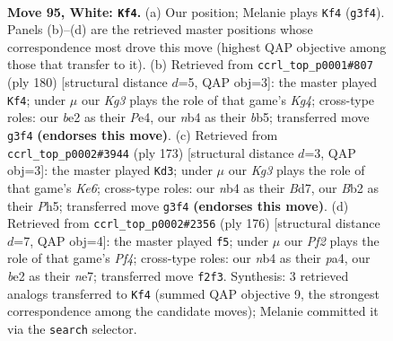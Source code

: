 \documentclass[11pt]{article}
\begin{document}
\clearpage

\begin{figure}[p]\centering
\begin{subfigure}{0.46\textwidth}\centering
\resizebox{\linewidth}{!}{%
\newchessgame
\chessboard[
  setfen={8/7k/8/8/1n6/6K1/1B2bP2/8 w - - 35 95},
  showmover=false,
  pgfstyle=straightmove, color=movearrow, markmove={g3-f4}
]}
\caption{}
\end{subfigure}\hfill
\begin{subfigure}{0.46\textwidth}\centering
\resizebox{\linewidth}{!}{%
\newchessgame
\chessboard[
  setfen={8/5k2/8/1b6/3BP1K1/5P2/8/8 w - - 5 91},
  showmover=false,
  pgfstyle=straightmove, color=movearrow, markmove={g4-f4}
]}
\caption{}
\end{subfigure}
\\[4pt]
\begin{subfigure}{0.46\textwidth}\centering
\resizebox{\linewidth}{!}{%
\newchessgame
\chessboard[
  setfen={8/3b4/8/7p/5p2/4k3/8/4B1K1 b - - 21 87},
  showmover=false,
  pgfstyle=straightmove, color=movearrow, markmove={e3-d3}
]}
\caption{}
\end{subfigure}\hfill
\begin{subfigure}{0.46\textwidth}\centering
\resizebox{\linewidth}{!}{%
\newchessgame
\chessboard[
  setfen={8/4n3/8/1k4K1/p4P2/8/5B2/8 w - - 0 89},
  showmover=false,
  pgfstyle=straightmove, color=movearrow, markmove={f4-f5}
]}
\caption{}
\end{subfigure}
\caption{\textbf{Move 95, White: \texttt{Kf4}.} (a) Our position; Melanie plays \texttt{Kf4} (\texttt{g3f4}). Panels (b)--(d) are the retrieved master positions whose correspondence most drove this move (highest QAP objective among those that transfer to it). (b) Retrieved from \texttt{ccrl\_top\_p0001\#807} (ply 180) [structural distance $d$=5, QAP obj=3]: the master played \texttt{Kf4}; under $\mu$ our \emph{Kg3} plays the role of that game's \emph{Kg4}; cross-type roles: our \emph{b}e2 as their \emph{P}e4, our \emph{n}b4 as their \emph{b}b5; transferred move \texttt{g3f4} \textbf{(endorses this move)}. (c) Retrieved from \texttt{ccrl\_top\_p0002\#3944} (ply 173) [structural distance $d$=3, QAP obj=3]: the master played \texttt{Kd3}; under $\mu$ our \emph{Kg3} plays the role of that game's \emph{Ke6}; cross-type roles: our \emph{n}b4 as their \emph{B}d7, our \emph{B}b2 as their \emph{P}h5; transferred move \texttt{g3f4} \textbf{(endorses this move)}. (d) Retrieved from \texttt{ccrl\_top\_p0002\#2356} (ply 176) [structural distance $d$=7, QAP obj=4]: the master played \texttt{f5}; under $\mu$ our \emph{Pf2} plays the role of that game's \emph{Pf4}; cross-type roles: our \emph{n}b4 as their \emph{p}a4, our \emph{b}e2 as their \emph{n}e7; transferred move \texttt{f2f3}. Synthesis: 3 retrieved analogs transferred to \texttt{Kf4} (summed QAP objective 9, the strongest correspondence among the candidate moves); Melanie committed it via the \texttt{search} selector.}
\label{fig:thought-m188}
\end{figure}
\end{document}
